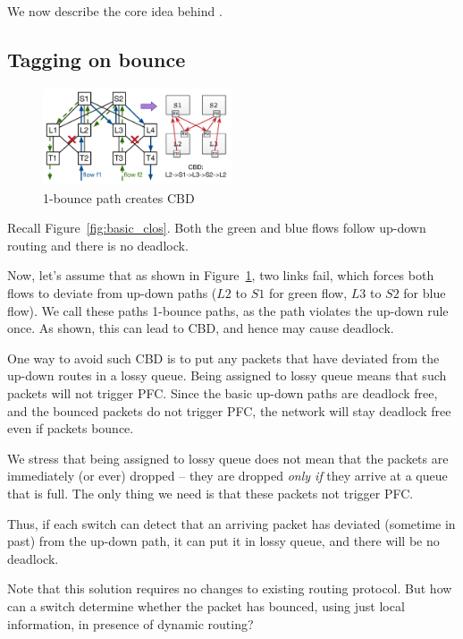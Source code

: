 We now describe the core idea behind \sysname{}.

\subsection{Tagging on bounce}
\label{subsec:tag}

\begin{figure}[t]
	\centering
	\includegraphics[width=0.5\textwidth] {figs/cbd_a}
	\caption{1-bounce path creates CBD}
	\label{fig:clos_1_bounce}
\end{figure}

Recall Figure~\ref{fig:basic_clos}. Both the green and blue flows follow up-down
routing and there is no deadlock.

Now, let's assume that as shown in Figure~\ref{fig:clos_1_bounce}, two
links fail, which forces both flows to deviate from up-down paths ($L2$ to
$S1$ for green flow, $L3$ to $S2$ for blue flow). We call these paths 1-bounce
paths, as the path violates the up-down rule once. As shown, this can lead to
CBD, and hence may cause deadlock.

One way to avoid such CBD is to put any packets that have deviated from the
up-down routes in a lossy queue.  Being assigned to lossy queue means that such
packets will not trigger PFC. Since the basic up-down paths are deadlock free,
and the bounced packets do not trigger PFC, the network will stay deadlock free
even if packets bounce.

We stress that being assigned to lossy queue does not mean that the packets are
immediately (or ever) dropped -- they are dropped {\em only if} they arrive at a
queue that is full. The only thing we need is that these packets not trigger
PFC.

Thus, if each switch can detect that an arriving packet has deviated (sometime
in past) from the up-down path, it can put it in lossy queue, and there will be
no deadlock.

Note that this solution requires no changes to existing routing protocol.  But
how can a switch determine whether the packet has bounced, using just local
information, in presence of dynamic routing?

